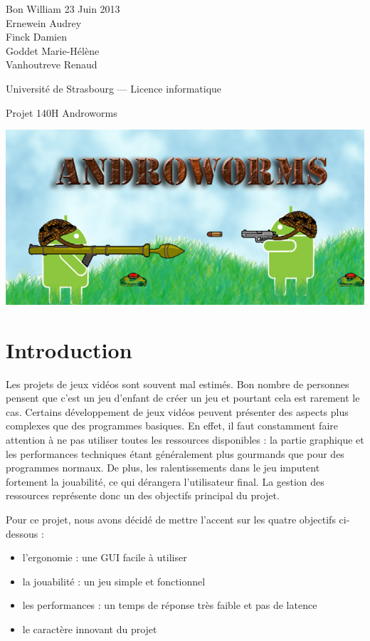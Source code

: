 \documentclass{report}
\begin{document}
\noindent
Bon William \hfill 23 Juin 2013\\
Ernewein Audrey\\
Finck Damien\\
Goddet Marie-Hélène\\
Vanhoutreve Renaud

\vfill
\begin{center}
{\Large Université de Strasbourg --- Licence informatique}

\bigskip
{\Large Projet 140H}
{\Large Androworms}
\bigskip

\includegraphics[scale=0.8]{images/splash}

\end{center}
\vfill
\newpage
\tableofcontents
\newpage

\section{Introduction}
Les projets de jeux vidéos sont souvent mal estimés. Bon nombre de personnes pensent que c'est un jeu d'enfant de créer un jeu et pourtant cela est rarement le cas. Certains développement de jeux vidéos peuvent présenter des aspects plus complexes que des programmes basiques. En effet, il faut constamment faire attention à ne pas utiliser toutes les ressources disponibles : la partie graphique et les performances techniques étant généralement plus gourmands que pour des programmes normaux. De plus, les ralentissements dans le jeu imputent fortement la jouabilité, ce qui dérangera l'utilisateur final. La gestion des ressources représente donc un des objectifs principal du projet.
\bigskip

Pour ce projet, nous avons décidé de mettre l'accent sur les quatre objectifs ci-dessous :
\begin{itemize}
\item l'ergonomie : une GUI facile à utiliser
\item la jouabilité : un jeu simple et fonctionnel
\item les performances : un temps de réponse très faible et pas de latence 
\item le caractère innovant du projet
\end{itemize}
\end{document}
